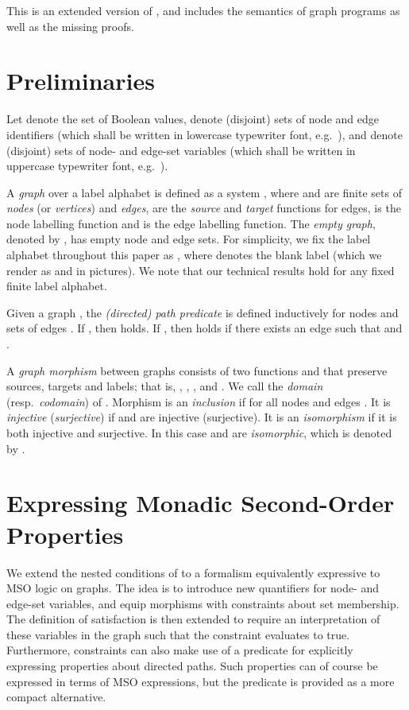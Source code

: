 \documentclass{llncs}
\begin{document}
	This is an extended version of \cite{Poskitt-Plump14a}, and includes the semantics of graph programs as well as the missing proofs.
	
	\section{Preliminaries}\label{sec:preliminaries}
	
	Let  denote the set of Boolean values,  denote (disjoint) sets of node and edge identifiers (which shall be written in lowercase typewriter font, e.g.\ ), and  denote (disjoint) sets of node- and edge-set variables (which shall be written in uppercase typewriter font, e.g.\ ).
	
	A \emph{graph}\/ over a label alphabet  is defined as a system , where  and  are finite sets of \emph{nodes} (or \emph{vertices}) and \emph{edges},  are the \emph{source} and \emph{target} functions for edges,  is the node labelling function and  is the edge labelling function. The \emph{empty graph}, denoted by , has empty node and edge sets. For simplicity, we fix the label alphabet throughout this paper as , where  denotes the blank label (which we render as  and  in pictures). We note that our technical results hold for any fixed finite label alphabet.
	
	Given a graph , the \emph{(directed) path predicate}  is defined inductively for nodes  and sets of edges . If , then  holds. If , then  holds if there exists an edge  such that  and .

	A \emph{graph morphism}  between graphs  consists of two functions  and \/ that preserve sources, targets and labels; that is, , , , and . We call  the \emph{domain} (resp.\ \emph{codomain}) of . Morphism  is an \emph{inclusion} if  for all nodes and edges . It is \emph{injective}\/ (\emph{surjective}) if  and  are injective (surjective). It is an \emph{isomorphism} if it is both injective and surjective. In this case  and \/ are \emph{isomorphic}, which is denoted by .


	\section{Expressing Monadic Second-Order Properties}\label{sec:expressing_mso_properties}
	
	We extend the nested conditions of \cite{Habel-Pennemann09a} to a formalism equivalently expressive to MSO logic on graphs. The idea is to introduce new quantifiers for node- and edge-set variables, and equip morphisms with constraints about set membership. The definition of satisfaction is then extended to require an interpretation of these variables in the graph such that the constraint evaluates to true. Furthermore, constraints can also make use of a predicate for explicitly expressing properties about directed paths. Such properties can of course be expressed in terms of MSO expressions, but the predicate is provided as a more compact alternative.
\end{document}

